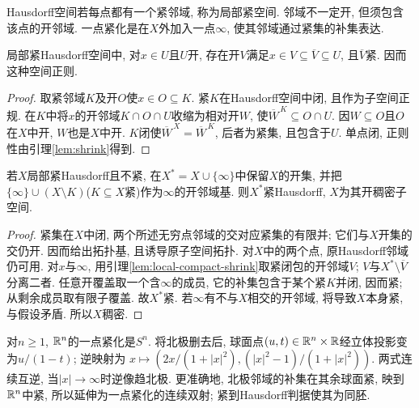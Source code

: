 \begin{definition}
Hausdorff空间若每点都有一个紧邻域, 称为局部紧空间. 邻域不一定开, 但须包含该点的开邻域. 一点紧化是在$X$外加入一点$\infty$, 使其邻域通过紧集的补集表达.
\end{definition}
\begin{lemma}\label{lem:local-compact-shrink}
局部紧Hausdorff空间中, 对$x\in U$且$U$开, 存在开$V$满足$x\in V\subseteq\overline V\subseteq U$, 且$\overline V$紧. 因而这种空间正则.
\end{lemma}
\begin{proof}
取紧邻域$K$及开$O$使$x\in O\subseteq K$. 紧$K$在Hausdorff空间中闭, 且作为子空间正规. 在$K$中将$x$的开邻域$K\cap O\cap U$收缩为相对开$W$, 使$\overline W^{\,K}\subseteq O\cap U$. 因$W\subseteq O$且$O$在$X$中开, $W$也是$X$中开. $K$闭使$\overline W^{\,X}=\overline W^{\,K}$, 后者为紧集, 且包含于$U$. 单点闭, 正则性由引理\ref{lem:shrink}得到.
\end{proof}

\begin{theorem}\label{thm:one-point}
若$X$局部紧Hausdorff且不紧, 在$X^*=X\cup\{\infty\}$中保留$X$的开集, 并把$\{\infty\}\cup(X\setminus K)$($K\subseteq X$紧)作为$\infty$的开邻域基. 则$X^*$紧Hausdorff, $X$为其开稠密子空间.
\end{theorem}
\begin{proof}
紧集在$X$中闭, 两个所述无穷点邻域的交对应紧集的有限并; 它们与$X$开集的交仍开. 因而给出拓扑基, 且诱导原子空间拓扑. 对$X$中的两个点, 原Hausdorff邻域仍可用. 对$x$与$\infty$, 用引理\ref{lem:local-compact-shrink}取紧闭包的开邻域$V$; $V$与$X^*\setminus\overline V$分离二者. 任意开覆盖取一个含$\infty$的成员, 它的补集包含于某个紧$K$并闭, 因而紧; 从剩余成员取有限子覆盖. 故$X^*$紧. 若$\infty$有不与$X$相交的开邻域, 将导致$X$本身紧, 与假设矛盾. 所以$X$稠密.
\end{proof}
对$n\ge1$, $\mathbb R^n$的一点紧化是$S^n$. 将北极删去后, 球面点$(u,t)\in\mathbb R^n\times\mathbb R$经立体投影变为$u/(1-t)$; 逆映射为
$x\mapsto(2x/(1+|x|^2),(|x|^2-1)/(1+|x|^2))$.
两式连续互逆, 当$|x|\to\infty$时逆像趋北极. 更准确地, 北极邻域的补集在其余球面紧, 映到$\mathbb R^n$中紧, 所以延伸为一点紧化的连续双射; 紧到Hausdorff判据使其为同胚.

